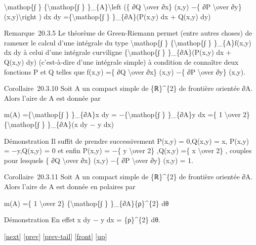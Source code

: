 \documentclass[]{article}
\begin{document}
\textbackslash{}mathop\{∫ \} \{\textbackslash{}mathop\{∫ \}
\}\_\{A\}\textbackslash{}left (\{ ∂Q \textbackslash{}over ∂x\} (x,y) −\{
∂P \textbackslash{}over ∂y\} (x,y)\textbackslash{}right ) dx dy
=\{\textbackslash{}mathop\{∫ \} \}\_\{∂A\}(P(x,y) dx + Q(x,y) dy)

Remarque~20.3.5 Le théorème de Green-Riemann permet (entre autres
choses) de ramener le calcul d'une intégrale du type
\textbackslash{}mathop\{∫ \} \{\textbackslash{}mathop\{∫ \}
\}\_\{A\}f(x,y) dx dy à celui d'une intégrale curviligne
\{\textbackslash{}mathop\{∫ \} \}\_\{∂A\}(P(x,y) dx + Q(x,y) dy)
(c'est-à-dire d'une intégrale simple) à condition de connaître deux
fonctions P et Q telles que f(x,y) =\{ ∂Q \textbackslash{}over ∂x\}
(x,y) −\{ ∂P \textbackslash{}over ∂y\} (x,y).

Corollaire~20.3.10 Soit A un compact simple de \{ℝ\}\^{}\{2\} de
frontière orientée ∂A. Alors l'aire de A est donnée par

m(A) =\{\textbackslash{}mathop\{∫ \} \}\_\{∂A\}x dy =
−\{\textbackslash{}mathop\{∫ \} \}\_\{∂A\}y dx =\{ 1
\textbackslash{}over 2\} \{\textbackslash{}mathop\{∫ \} \}\_\{∂A\}(x dy
− y dx)

Démonstration Il suffit de prendre successivement P(x,y) = 0,Q(x,y) = x,
P(x,y) = −y,Q(x,y) = 0 et enfin P(x,y) = −\{ y \textbackslash{}over 2\}
,Q(x,y) =\{ x \textbackslash{}over 2\} , couples pour lesquels \{ ∂Q
\textbackslash{}over ∂x\} (x,y) −\{ ∂P \textbackslash{}over ∂y\} (x,y) =
1.

Corollaire~20.3.11 Soit A un compact simple de \{ℝ\}\^{}\{2\} de
frontière orientée ∂A. Alors l'aire de A est donnée en polaires par

m(A) =\{ 1 \textbackslash{}over 2\} \{\textbackslash{}mathop\{∫ \}
\}\_\{∂A\}\{ρ\}\^{}\{2\} dθ

Démonstration En effet x dy − y dx = \{ρ\}\^{}\{2\} dθ.

{[}\href{coursse107.html}{next}{]} {[}\href{coursse105.html}{prev}{]}
{[}\href{coursse105.html\#tailcoursse105.html}{prev-tail}{]}
{[}\href{coursse106.html}{front}{]}
{[}\href{coursch21.html\#coursse106.html}{up}{]}
\end{document}
